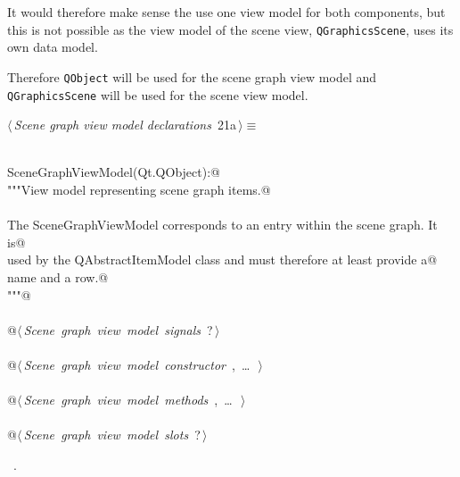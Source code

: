 \documentclass[
    a4paper,      %
    10pt,         %
    openright,    %
    notitlepage,  %
    parskip=half, %
]{scrreprt}       %
\theoremstyle{definition}                    %
\begin{document}
It would therefore make sense the use one view model for both components, but
this is not possible as the view model of the scene view, \verb+QGraphicsScene+,
uses its own data model.

Therefore \verb+QObject+ will be used for the scene graph view model and
\verb+QGraphicsScene+ will be used for the scene view model.

\begin{flushleft} \small
\begin{minipage}{\linewidth}\label{scrap14}\raggedright\small
{} $\langle\,${\itshape Scene graph view model declarations}\nobreak\ {\footnotesize {21a}}$\,\rangle\equiv$
\vspace{-1exm}
\begin{list}{}{} \item
\mbox{}\lstinline@@\\
\mbox{}\lstinline@class SceneGraphViewModel(Qt.QObject):@\\
\mbox{}\lstinline@    """View model representing scene graph items.@\\
\mbox{}\lstinline@@\\
\mbox{}\lstinline@    The SceneGraphViewModel corresponds to an entry within the scene graph. It is@\\
\mbox{}\lstinline@    used by the QAbstractItemModel class and must therefore at least provide a@\\
\mbox{}\lstinline@    name and a row.@\\
\mbox{}\lstinline@    """@\\
\mbox{}\lstinline@@\\
\mbox{}\lstinline@    @\hbox{$\langle\,${\itshape Scene graph view model signals}\nobreak\ {\footnotesize ?}$\,\rangle$}\lstinline@@\\
\mbox{}\lstinline@@\\
\mbox{}\lstinline@    @\hbox{$\langle\,${\itshape Scene graph view model constructor}\nobreak\ {\footnotesize {}, \ldots\ }$\,\rangle$}\lstinline@@\\
\mbox{}\lstinline@@\\
\mbox{}\lstinline@    @\hbox{$\langle\,${\itshape Scene graph view model methods}\nobreak\ {\footnotesize {}, \ldots\ }$\,\rangle$}\lstinline@@\\
\mbox{}\lstinline@@\\
\mbox{}\lstinline@    @\hbox{$\langle\,${\itshape Scene graph view model slots}\nobreak\ {\footnotesize ?}$\,\rangle$}\lstinline@@\\
\mbox{}\lstinline@@{\NWsep}
\end{list}
\vspace{-1.5ex}
\footnotesize
\begin{list}{}{\setlength{\itemsep}{-\parsep}\setlength{\itemindent}{-\leftmargin}}
\item \NWtxtMacroRefIn\ .

\item{}
\end{list}
\end{minipage}\vspace{4ex}
\end{flushleft}
\end{document}
